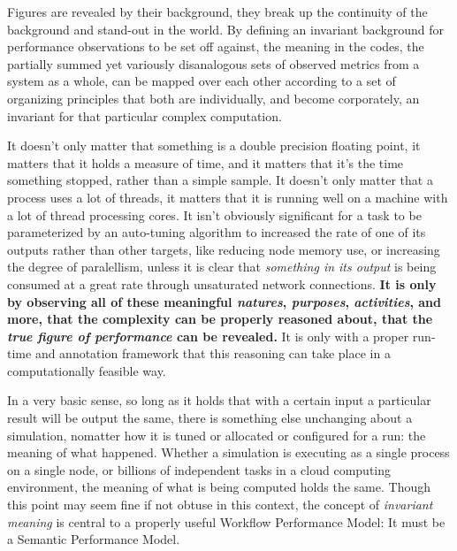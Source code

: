 Figures are revealed by their background, they break up the continuity
of the background and stand-out in the world. By defining an invariant
background for performance observations to be set off against, the
meaning in the codes, the partially summed yet variously disanalogous
sets of observed metrics from a system as a whole, can be mapped over
each other according to a set of organizing principles that both are
individually, and become corporately, an invariant for that particular
complex computation.

It doesn't only matter that something is a double precision floating
point, it matters that it holds a measure of time, and it matters that
it's the time something stopped, rather than a simple sample.  It
doesn't only matter that a process uses a lot of threads, it matters
that it is running well on a machine with a lot of thread processing
cores. It isn't obviously significant for a task to be parameterized
by an auto-tuning algorithm to increased the rate of one of its
outputs rather than other targets, like reducing node memory use, or
increasing the degree of paralellism, unless it is clear that
\textit{something in its output} is being consumed at a great rate
through unsaturated network connections. \textbf{It is only by
  observing all of these meaningful \textit{natures},
  \textit{purposes}, \textit{activities}, and more, that the
  complexity can be properly reasoned about, that the \textit{true
    figure of performance} can be revealed.} It is only with a proper
run-time and annotation framework that this reasoning can take place
in a computationally feasible way.

In a very basic sense, so long as it holds that with a certain input a
particular result will be output the same, there is something else
unchanging about a simulation, nomatter how it is tuned or allocated
or configured for a run: the meaning of what happened.  Whether a
simulation is executing as a single process on a single node, or
billions of independent tasks in a cloud computing environment, the
meaning of what is being computed holds the same. Though this point
may seem fine if not obtuse in this context, the concept of
\textit{invariant meaning} is central to a properly useful Workflow
Performance Model: It must be a Semantic Performance Model.

